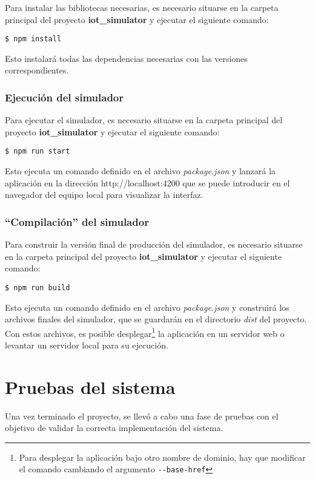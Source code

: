 Para instalar las bibliotecas necesarias, es necesario situarse en la carpeta principal del proyecto \textbf{iot\_simulator} y ejecutar el siguiente comando:
\begin{verbatim}
$ npm install
\end{verbatim}

Esto instalará todas las dependencias necesarias con las versiones correspondientes.

\subsubsection{Ejecución del simulador}
\label{subsubsec:EjecucionSimulador}
Para ejecutar el simulador, es necesario situarse en la carpeta principal del proyecto \textbf{iot\_simulator} y ejecutar el siguiente comando:

\begin{verbatim}
$ npm run start
\end{verbatim}

Esto ejecuta un comando definido en el archivo \textit{package.json} y lanzará la aplicación en la dirección http://localhost:4200 que se puede introducir en el navegador del equipo local para visualizar la interfaz.

\subsubsection{``Compilación'' del simulador}
\label{subsubsec:EjecucionSimulador}
Para construir la versión final de producción del simulador, es necesario situarse en la carpeta principal del proyecto \textbf{iot\_simulator} y ejecutar el siguiente comando:

\begin{verbatim}
$ npm run build
\end{verbatim}

Esto ejecuta un comando definido en el archivo \textit{package.json} y construirá los archivos finales del simulador, que se guardarán en el directorio \textit{dist} del proyecto. Con estos archivos, es posible desplegar\footnote{Para desplegar la aplicación bajo otro nombre de dominio, hay que modificar el comando cambiando el argumento \texttt{-{}-base-href}} la aplicación en un servidor web o levantar un servidor local para su ejecución.


\section{Pruebas del sistema}
\label{sec:Pruebas}
Una vez terminado el proyecto, se llevó a cabo una fase de pruebas con el objetivo de validar la correcta implementación del sistema.

